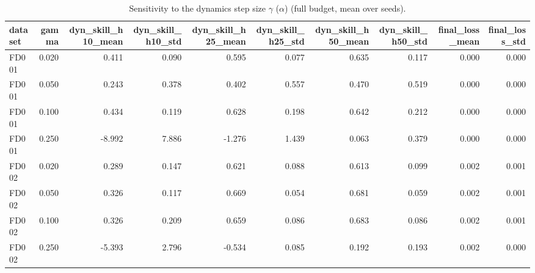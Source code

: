 \begin{table}[t]
\centering
\caption{Sensitivity to the dynamics step size $\gamma$ ($\alpha$) (full budget, mean over seeds).}
\label{tab:sens_gamma}
\begin{tabular}{lrrrrrrrrr}
\toprule
dataset & gamma & dyn\_skill\_h10\_mean & dyn\_skill\_h10\_std & dyn\_skill\_h25\_mean & dyn\_skill\_h25\_std & dyn\_skill\_h50\_mean & dyn\_skill\_h50\_std & final\_loss\_mean & final\_loss\_std \\
\midrule
FD001 & 0.020 & 0.411 & 0.090 & 0.595 & 0.077 & 0.635 & 0.117 & 0.000 & 0.000 \\
FD001 & 0.050 & 0.243 & 0.378 & 0.402 & 0.557 & 0.470 & 0.519 & 0.000 & 0.000 \\
FD001 & 0.100 & 0.434 & 0.119 & 0.628 & 0.198 & 0.642 & 0.212 & 0.000 & 0.000 \\
FD001 & 0.250 & -8.992 & 7.886 & -1.276 & 1.439 & 0.063 & 0.379 & 0.000 & 0.000 \\
FD002 & 0.020 & 0.289 & 0.147 & 0.621 & 0.088 & 0.613 & 0.099 & 0.002 & 0.001 \\
FD002 & 0.050 & 0.326 & 0.117 & 0.669 & 0.054 & 0.681 & 0.059 & 0.002 & 0.001 \\
FD002 & 0.100 & 0.326 & 0.209 & 0.659 & 0.086 & 0.683 & 0.086 & 0.002 & 0.001 \\
FD002 & 0.250 & -5.393 & 2.796 & -0.534 & 0.085 & 0.192 & 0.193 & 0.002 & 0.000 \\
\bottomrule
\end{tabular}
\end{table}